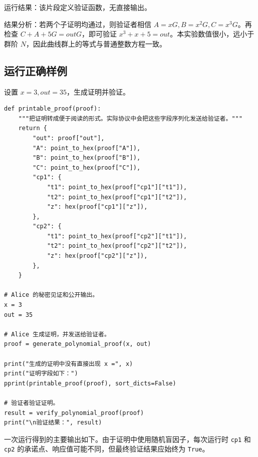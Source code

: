\documentclass[a4paper]{article}
\begin{document}
	运行结果：该片段定义验证函数，无直接输出。
	
	结果分析：若两个子证明均通过，则验证者相信 \(A=xG,B=x^{2}G,C=x^{3}G\)。再检查 \(C+A+5G=outG\)，即可验证 \(x^{3}+x+5=out\)。本实验数值很小，远小于群阶 \(N\)，因此曲线群上的等式与普通整数方程一致。
	
	\subsection{运行正确样例}
	设置 \(x=3,out=35\)，生成证明并验证。
	
	\begin{lstlisting}[caption={生成证明并验证}]
def printable_proof(proof):
    """把证明转成便于阅读的形式。实际协议中会把这些字段序列化发送给验证者。"""
    return {
        "out": proof["out"],
        "A": point_to_hex(proof["A"]),
        "B": point_to_hex(proof["B"]),
        "C": point_to_hex(proof["C"]),
        "cp1": {
            "t1": point_to_hex(proof["cp1"]["t1"]),
            "t2": point_to_hex(proof["cp1"]["t2"]),
            "z": hex(proof["cp1"]["z"]),
        },
        "cp2": {
            "t1": point_to_hex(proof["cp2"]["t1"]),
            "t2": point_to_hex(proof["cp2"]["t2"]),
            "z": hex(proof["cp2"]["z"]),
        },
    }

# Alice 的秘密见证和公开输出。
x = 3
out = 35

# Alice 生成证明，并发送给验证者。
proof = generate_polynomial_proof(x, out)

print("生成的证明中没有直接出现 x =", x)
print("证明字段如下：")
pprint(printable_proof(proof), sort_dicts=False)

# 验证者验证证明。
result = verify_polynomial_proof(proof)
print("\n验证结果：", result)
	\end{lstlisting}
	
	一次运行得到的主要输出如下。由于证明中使用随机盲因子，每次运行时 \texttt{cp1} 和 \texttt{cp2} 的承诺点、响应值可能不同，但最终验证结果应始终为 \texttt{True}。
	
\end{document}
